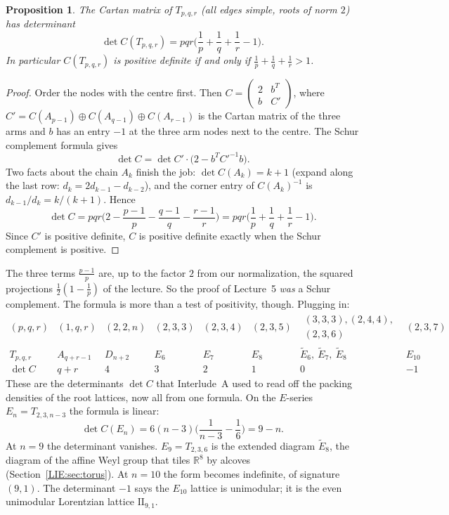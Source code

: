 \documentclass[11pt,openany]{book}
\theoremstyle{plain}
\newtheorem{proposition}[theorem]{Proposition}
\theoremstyle{definition}
\theoremstyle{remark}
\newcommand{\R}{\mathbb{R}}
\begin{document}
\begin{proposition}\label{DYN:prop:detT}
The Cartan matrix of $T_{p,q,r}$ (all edges simple, roots of norm $2$) has determinant
\[
  \det C(T_{p,q,r})=pqr\Big(\frac1p+\frac1q+\frac1r-1\Big).
\]
In particular $C(T_{p,q,r})$ is positive definite if and only if $\frac1p+\frac1q+\frac1r>1$.
\end{proposition}

\begin{proof}
Order the nodes with the centre first. Then
$C=\left(\begin{smallmatrix}2&b^T\\ b&C'\end{smallmatrix}\right)$, where
$C'=C(A_{p-1})\oplus C(A_{q-1})\oplus C(A_{r-1})$ is the Cartan matrix of the three arms and $b$ has an
entry $-1$ at the three arm nodes next to the centre. The Schur complement formula gives
\[
  \det C=\det C'\cdot\big(2-b^TC'^{-1}b\big).
\]
Two facts about the chain $A_k$ finish the job: $\det C(A_k)=k+1$ (expand along the last row:
$d_k=2d_{k-1}-d_{k-2}$), and the corner entry of $C(A_k)^{-1}$ is
$d_{k-1}/d_k=k/(k+1)$. Hence
\[
  \det C=pqr\Big(2-\frac{p-1}p-\frac{q-1}q-\frac{r-1}r\Big)=pqr\Big(\frac1p+\frac1q+\frac1r-1\Big).
\]
Since $C'$ is positive definite, $C$ is positive definite exactly when the Schur complement is
positive.
\end{proof}

The three terms $\frac{p-1}p$ are, up to the factor $2$ from our normalization, the squared
projections $\frac12(1-\frac1p)$ of the lecture. So the proof of Lecture~5 \emph{was} a Schur complement.
The formula is more than a test of positivity, though. Plugging in:
{\small\setlength{\arraycolsep}{4pt}\[
  \begin{array}{l|cccccccc}
  (p,q,r) & (1,q,r) & (2,2,n) & (2,3,3) & (2,3,4) & (2,3,5) & \begin{smallmatrix}(3,3,3),(2,4,4),\\(2,3,6)\end{smallmatrix} & (2,3,7)\\ \hline
  T_{p,q,r} & A_{q+r-1} & D_{n+2} & E_6 & E_7 & E_8 & \tilde E_6,\ \tilde E_7,\ \tilde E_8 & E_{10}\\
  \det C & q+r & 4 & 3 & 2 & 1 & 0 & -1
  \end{array}
\]}
These are the determinants $\det C$ that Interlude~A used to read off the packing densities of the
root lattices, now all from one formula. On the $E$-series $E_n=T_{2,3,n-3}$ the formula is linear:
\begin{equation}\label{DYN:eq:Edet}
  \det C(E_n)=6(n-3)\Big(\frac1{n-3}-\frac16\Big)=9-n .
\end{equation}
At $n=9$ the determinant vanishes. $E_9=T_{2,3,6}$ is the extended diagram $\tilde E_8$, the
diagram of the affine Weyl group that tiles $\R^8$ by alcoves (Section~\ref{LIE:sec:torus}). At
$n=10$ the form becomes indefinite, of signature $(9,1)$. The determinant $-1$ says the $E_{10}$ lattice is
unimodular; it is the even unimodular Lorentzian lattice $\mathrm{II}_{9,1}$.
\end{document}
